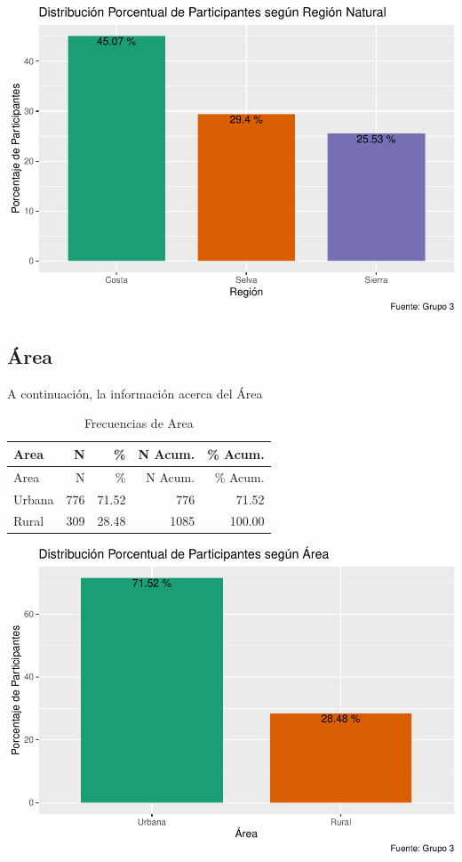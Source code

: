 \documentclass[
]{article}
\begin{document}
\includegraphics{Info_Dinix_02_files/figure-latex/30_RegNat-1.pdf}

\subsection{Área}\label{uxe1rea}

A continuación, la información acerca del Área

\begin{longtable}[]{@{}lrrrr@{}}
\caption{Frecuencias de Area}\tabularnewline
\toprule\noalign{}
Area & N & \% & N Acum. & \% Acum. \\
\midrule\noalign{}
\endfirsthead
\toprule\noalign{}
Area & N & \% & N Acum. & \% Acum. \\
\midrule\noalign{}
\endhead
\bottomrule\noalign{}
\endlastfoot
Urbana & 776 & 71.52 & 776 & 71.52 \\
Rural & 309 & 28.48 & 1085 & 100.00 \\
\end{longtable}

\includegraphics{Info_Dinix_02_files/figure-latex/30_Area-1.pdf}
\end{document}
